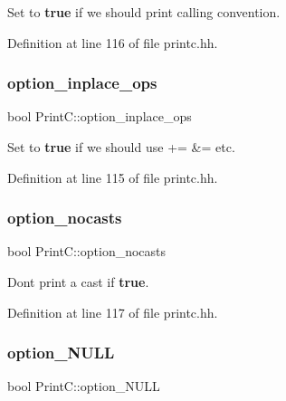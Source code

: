 Set to {\bfseries{true}} if we should print calling convention. 



Definition at line 116 of file printc.\+hh.

\mbox{\label{class_print_c_a71501a4855f612214c23eb5d9ae584ae}} 
\subsubsection{\texorpdfstring{option\_inplace\_ops}{option\_inplace\_ops}}
{\footnotesize\ttfamily bool Print\+C\+::option\+\_\+inplace\+\_\+ops\hspace{0.3cm}{\ttfamily [protected]}}



Set to {\bfseries{true}} if we should use \textquotesingle{}+=\textquotesingle{} \textquotesingle{}\&=\textquotesingle{} etc. 



Definition at line 115 of file printc.\+hh.

\mbox{\label{class_print_c_af2d3e095bea7152010bc849ec310525f}} 
\subsubsection{\texorpdfstring{option\_nocasts}{option\_nocasts}}
{\footnotesize\ttfamily bool Print\+C\+::option\+\_\+nocasts\hspace{0.3cm}{\ttfamily [protected]}}



Don\textquotesingle{}t print a cast if {\bfseries{true}}. 



Definition at line 117 of file printc.\+hh.

\mbox{\label{class_print_c_a3c9c17128122dfdad309f994fe2f3864}} 
\subsubsection{\texorpdfstring{option\_NULL}{option\_NULL}}
{\footnotesize\ttfamily bool Print\+C\+::option\+\_\+\+N\+U\+LL\hspace{0.3cm}{\ttfamily [protected]}}



